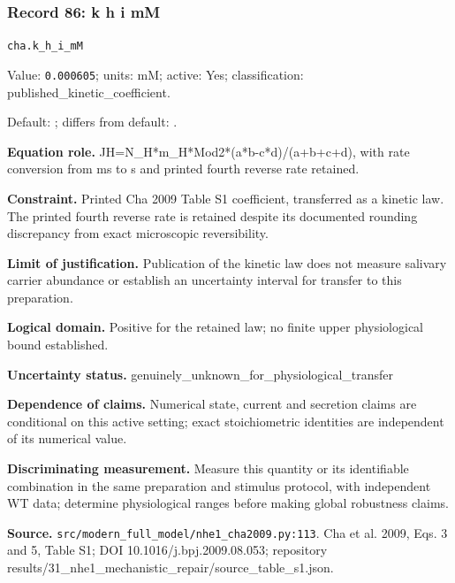 \subsubsection*{Record 86: k h i mM}
{\small \nolinkurl{cha.k_h_i_mM}\par

Value: \texttt{0.000605}; units: mM; active: Yes; classification: published\_kinetic\_coefficient.\par

Default: ; differs from default: .\par

\textbf{Equation role.} JH=N\_H*m\_H*Mod2*(a*b-c*d)/(a+b+c+d), with rate conversion from ms to s and printed fourth reverse rate retained.\par

\textbf{Constraint.} Printed Cha 2009 Table S1 coefficient, transferred as a kinetic law. The printed fourth reverse rate is retained despite its documented rounding discrepancy from exact microscopic reversibility.\par

\textbf{Limit of justification.} Publication of the kinetic law does not measure salivary carrier abundance or establish an uncertainty interval for transfer to this preparation.\par

\textbf{Logical domain.} Positive for the retained law; no finite upper physiological bound established.\par

\textbf{Uncertainty status.} genuinely\_unknown\_for\_physiological\_transfer\par

\textbf{Dependence of claims.} Numerical state, current and secretion claims are conditional on this active setting; exact stoichiometric identities are independent of its numerical value.\par

\textbf{Discriminating measurement.} Measure this quantity or its identifiable combination in the same preparation and stimulus protocol, with independent WT data; determine physiological ranges before making global robustness claims.\par

\textbf{Source.} \nolinkurl{src/modern_full_model/nhe1_cha2009.py:113}. Cha et al. 2009, Eqs. 3 and 5, Table S1; DOI 10.1016/j.bpj.2009.08.053; repository results/31\_nhe1\_mechanistic\_repair/source\_table\_s1.json.\par}

